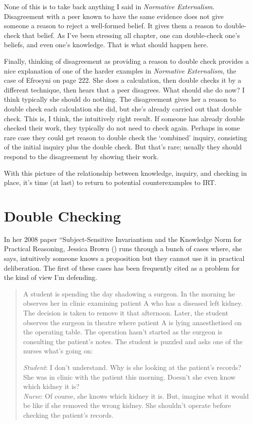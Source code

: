 \documentclass[
  10pt,
  letterpaper,
  twoside]{scrbook}
\begin{document}
None of this is to take back anything I said in \emph{Normative
Externalism}. Disagreement with a peer known to have the same evidence
does not give someone a reason to reject a well-formed belief. It gives
them a reason to double-check that belief. As I've been stressing all
chapter, one can double-check one's beliefs, and even one's knowledge.
That is what should happen here.

Finally, thinking of disagreement as providing a reason to double check
provides a nice explanation of one of the harder examples in
\emph{Normative Externalism}, the case of Efrosyni on page 222. She does
a calculation, then double checks it by a different technique, then
hears that a peer disagrees. What should she do now? I think typically
she should do nothing. The disagreement gives her a reason to double
check each calculation she did, but she's already carried out that
double check. This is, I think, the intuitively right result. If someone
has already double checked their work, they typically do not need to
check again. Perhaps in some rare case they could get reason to double
check the `combined' inquiry, consisting of the initial inquiry plus the
double check. But that's rare; usually they should respond to the
disagreement by showing their work.

With this picture of the relationship between knowledge, inquiry, and
checking in place, it's time (at last) to return to potential
counterexamples to IRT.

\section{Double Checking}\label{sec-doublecheck}

In her 2008 paper ``Subject-Sensitive Invariantism and the Knowledge
Norm for Practical Reasoning, Jessica Brown
() runs through a bunch of cases where,
she says, intuitively someone knows a proposition but they cannot use it
in practical deliberation. The first of these cases has been frequently
cited as a problem for the kind of view I'm defending.

\begin{quote}
A student is spending the day shadowing a surgeon. In the morning he
observes her in clinic examining patient A who has a diseased left
kidney. The decision is taken to remove it that afternoon. Later, the
student observes the surgeon in theatre where patient A is lying
anaesthetised on the operating table. The operation hasn't started as
the surgeon is consulting the patient's notes. The student is puzzled
and asks one of the nurses what's going on:

\emph{Student}: I don't understand. Why is she looking at the patient's
records? She was in clinic with the patient this morning. Doesn't she
even know which kidney it is?\\
\emph{Nurse}: Of course, she knows which kidney it is. But, imagine what
it would be like if she removed the wrong kidney. She shouldn't operate
before checking the patient's records.
\end{quote}
\end{document}
